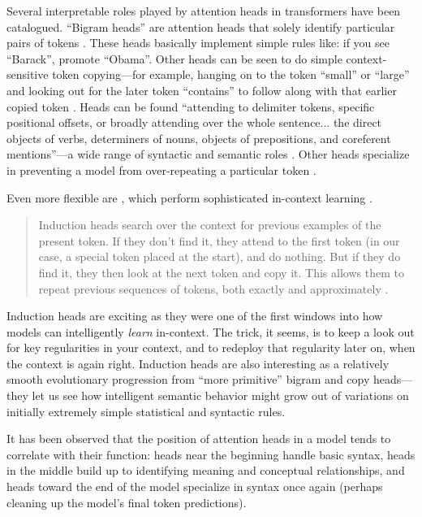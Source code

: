Several interpretable roles played by attention heads in transformers have been
catalogued. ``Bigram heads'' are attention heads that solely identify
particular pairs of tokens \cite{elhage2021mathematical}. These heads basically
implement simple rules like: if you see ``Barack'', promote ``Obama''. Other
heads can be seen to do simple context-sensitive token copying---for example,
hanging on to the token ``small'' or ``large'' and looking out for the later
token ``contains'' to follow along with that earlier copied token
\cite{elhage2021mathematical}. Heads can be found ``attending to delimiter
tokens, specific positional offsets, or broadly attending over the whole
sentence... the direct objects of verbs, determiners of nouns, objects of
prepositions, and coreferent mentions''---a wide range of syntactic and
semantic roles \cite{clark2019does, voita-etal-2019-analyzing}. Other heads
specialize in preventing a model from over-repeating a particular token
\cite{mcdougall2023copy}.

Even more flexible are , which perform sophisticated
in-context learning \cite{elhage2021mathematical,olsson2022context}.

\begin{quote}
Induction heads search over the context for previous examples of the present
token. If they don't find it, they attend to the first token (in our case, a
special token placed at the start), and do nothing. But if they do find it,
they then look at the next token and copy it. This allows them to repeat
previous sequences of tokens, both exactly and approximately
\cite{elhage2021mathematical}.
\end{quote}

Induction heads are exciting as they were one of the first windows into how
models can intelligently \emph{learn} in-context. The trick, it seems, is to
keep a look out for key regularities in your context, and to redeploy that
regularity later on, when the context is again right. Induction heads are also
interesting as a relatively smooth evolutionary progression from ``more
primitive'' bigram and copy heads---they let us see how intelligent semantic
behavior might grow out of variations on initially extremely simple statistical
and syntactic rules.

It has been observed that the position of attention heads in a model tends to
correlate with their function: heads near the beginning handle basic syntax,
heads in the middle build up to identifying meaning and conceptual
relationships, and heads toward the end of the model specialize in syntax once
again (perhaps cleaning up the model's final token predictions).


